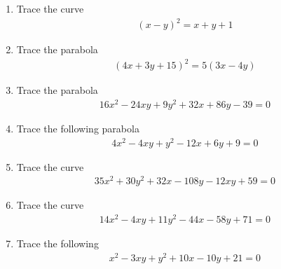 \renewcommand{\theequation}{\theenumi}
\renewcommand{\thefigure}{\theenumi}
\begin{enumerate}[label=\thesubsection.\arabic*.,ref=\thesubsection.\theenumi]
%
\item 	Trace the curve 
	\begin{align}
	\left(x-y\right)^2 = x+y+1
	\label{eq:solutions/41/2/eq0}
	\end{align}
%
\solution

%
\item Trace the parabola
\begin{align}
    (4x+3y+15)^2=5(3x-4y)
\end{align}
%
\solution

%
\item Trace the parabola
\begin{align}
   16x^2-24xy+9y^2+32x+86y-39=0 \label{eq:solutions/41/8/eq:given}
\end{align}
%
\solution

\item Trace the following parabola
\begin{align}
    4x^2-4xy+y^2-12x+6y+9=0
\end{align}
%
%
\solution

\item Trace the curve
\begin{align}
35x^2+30y^2+32x-108y-12xy+59=0 \label{eq:solutions/41/ex/given_curve_eq}
\end{align}
%
\solution

\item Trace the curve
\begin{align}
14x^2 - 4xy + 11y^2 - 44x - 58y + 71 =0  \label{eq:solutions/41/ex1/given_curve_eq}
\end{align}

\solution

\item Trace the following 
\begin{align}
    x^2-3xy+y^2+10x-10y+21=0 \label{eq:solutions/41/ex2/eq 1}
\end{align}
%
\solution


\end{enumerate}
